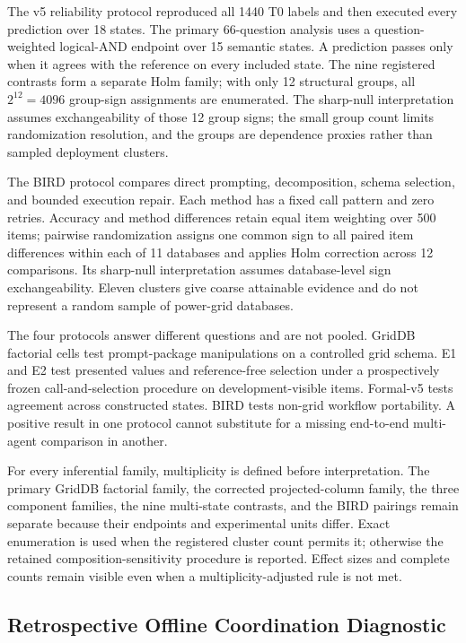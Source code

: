 \documentclass[applsci,article,submit,moreauthors]{Definitions/mdpi}
\begin{document}
The v5 reliability protocol reproduced all 1440 T0 labels and then executed every prediction over 18 states. The primary 66-question analysis uses a question-weighted logical-AND endpoint over 15 semantic states. A prediction passes only when it agrees with the reference on every included state. The nine registered contrasts form a separate Holm family; with only 12 structural groups, all $2^{12}=4096$ group-sign assignments are enumerated. The sharp-null interpretation assumes exchangeability of those 12 group signs; the small group count limits randomization resolution, and the groups are dependence proxies rather than sampled deployment clusters.

The BIRD protocol compares direct prompting, decomposition, schema selection, and bounded execution repair. Each method has a fixed call pattern and zero retries. Accuracy and method differences retain equal item weighting over 500 items; pairwise randomization assigns one common sign to all paired item differences within each of 11 databases and applies Holm correction across 12 comparisons. Its sharp-null interpretation assumes database-level sign exchangeability. Eleven clusters give coarse attainable evidence and do not represent a random sample of power-grid databases.

The four protocols answer different questions and are not pooled. GridDB factorial cells test prompt-package manipulations on a controlled grid schema. E1 and E2 test presented values and reference-free selection under a prospectively frozen call-and-selection procedure on development-visible items. Formal-v5 tests agreement across constructed states. BIRD tests non-grid workflow portability. A positive result in one protocol cannot substitute for a missing end-to-end multi-agent comparison in another.

For every inferential family, multiplicity is defined before interpretation. The primary GridDB factorial family, the corrected projected-column family, the three component families, the nine multi-state contrasts, and the BIRD pairings remain separate because their endpoints and experimental units differ. Exact enumeration is used when the registered cluster count permits it; otherwise the retained composition-sensitivity procedure is reported. Effect sizes and complete counts remain visible even when a multiplicity-adjusted rule is not met.

\subsection{Retrospective Offline Coordination Diagnostic}
\end{document}
